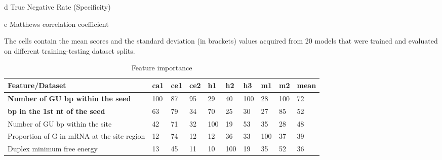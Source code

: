 \documentclass{bmcart}
\begin{document}
\begin{backmatter}
\begin{table}[h!]
\begin{threeparttable}
\begin{tablenotes}
\item[d] True Negative Rate (Specificity)
\item[e] Matthews correlation coefficient
\end{tablenotes}
\end{threeparttable}
\caption*{The cells contain the mean scores and the standard deviation (in brackets) values acquired from 20 models that were trained and evaluated on different training-testing dataset splits.}
\end{table}



\begin{table}[h!]
\caption{Feature importance}
\label{tab:feature_importance}
 \begin{threeparttable}
\begin{tabular}{|l|l|l|l|l|l|l|l|l|l|}
\hline
\textbf{Feature/Dataset}                          & \textbf{ca1} & \textbf{ce1} & \textbf{ce2} & \textbf{h1} & \textbf{h2} & \textbf{h3} & \textbf{m1} & \textbf{m2} & \textbf{mean} \\ \hline
\textbf{Number of GU bp within the seed\tnote{n}}              & 100\tnote{*}          & 87\tnote{*}           & 95\tnote{*}           & 29\tnote{*}          & 40\tnote{*}          & 100\tnote{*}         & 28          & 100\tnote{*}         & 72            \\ \hline
\textbf{bp in the 1st nt of the seed\tnote{b}}                    & 63\tnote{*}           & 79\tnote{*}           & 34\tnote{*}           & 70\tnote{*}          & 25\tnote{*}          & 30\tnote{*}          & 27          & 85\tnote{*}          & 52            \\ \hline
Number of GU bp within the site\tnote{n}                      & 42\tnote{*}           & 71\tnote{*}           & 32\tnote{*}           & 100\tnote{*}         & 19          & 53\tnote{*}          & 35\tnote{*}          & 28\tnote{*}          & 48            \\ \hline
Proportion of G in mRNA at the site region\tnote{n}                             & 12           & 74\tnote{*}           & 12           & 12          & 36\tnote{*}          & 33\tnote{*}          & 100\tnote{*}         & 37\tnote{*}          & 39            \\ \hline
Duplex minimum free energy\tnote{n}                               & 13\tnote{*}           & 45           & 11           & 10          & 100\tnote{*}         & 19          & 35\tnote{*}          & 52\tnote{*}          & 36            \\ \hline

\end{tabular}
\end{threeparttable}
\end{table}
\end{backmatter}
\end{document}
